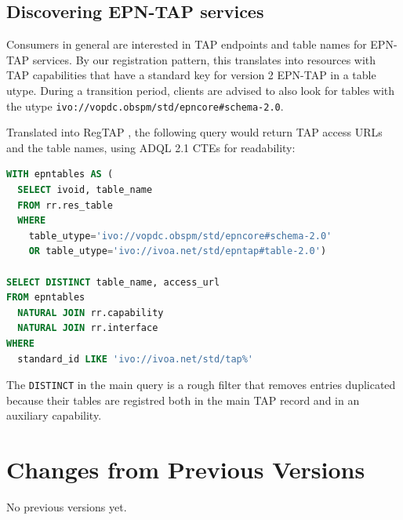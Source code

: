\documentclass[11pt,a4paper]{ivoa}
\begin{document}
\subsection{Discovering EPN-TAP services}

Consumers in general are interested in TAP endpoints and table names for
EPN-TAP services.  By our registration pattern, this translates into
resources with TAP capabilities that have a standard key for version 2
EPN-TAP in a table utype.  During a transition period, clients are
advised to also look for tables with the utype
\verb|ivo://vopdc.obspm/std/epncore#schema-2.0|.

Translated into RegTAP \citep{2019ivoa.spec.1011D}, the following query
would return TAP access URLs and the table names, using ADQL 2.1 CTEs
for readability:

\begin{lstlisting}[language=SQL]
WITH epntables AS (
  SELECT ivoid, table_name
  FROM rr.res_table
  WHERE
    table_utype='ivo://vopdc.obspm/std/epncore#schema-2.0'
    OR table_utype='ivo://ivoa.net/std/epntap#table-2.0')

SELECT DISTINCT table_name, access_url
FROM epntables
  NATURAL JOIN rr.capability
  NATURAL JOIN rr.interface
WHERE
  standard_id LIKE 'ivo://ivoa.net/std/tap%'
\end{lstlisting}

The \texttt{DISTINCT} in the main query is a rough filter that removes
entries duplicated because their tables are registred both in the main
TAP record and in an auxiliary capability.

\appendix
\section{Changes from Previous Versions}

No previous versions yet.  



\end{document}
